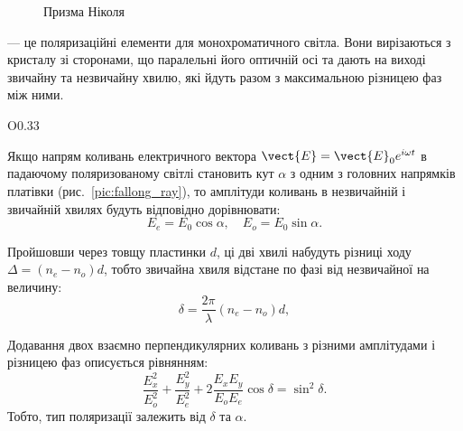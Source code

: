 \begin{figure}[h!]\centering

\caption{Призма Ніколя}
\label{pic:Nicol}
\end{figure}


 --- це поляризаційні елементи для
монохроматичного світла. Вони вирізаються з кристалу зі сторонами, що
паралельні його оптичній осі та дають на виході звичайну та незвичайну
хвилю, які йдуть разом з максимальною різницею фаз між ними.

\begin{wrapfigure}{O}{0.33\linewidth}\centering
\caption{Амплітуди коливань звичайного і незвичайного променів}
\label{pic:fallong_ray}
\end{wrapfigure}
Якщо напрям коливань електричного вектора $ \vect{E} = \vect{E}_0 e^{i\omega t}  $ в падаючому поляризованому світлі становить кут $\alpha$ з одним з головних напрямків платівки (рис.~\ref{pic:fallong_ray}), то амплітуди коливань в незвичайній і звичайній хвилях будуть відповідно дорівнювати:
\begin{equation*}
    E_e = E_0 \cos\alpha,\quad E_o = E_0\sin\alpha.
\end{equation*}


Пройшовши через товщу пластинки $ d $, ці дві хвилі набудуть різниці ходу  $ \Delta = (n_e - n_o) d$, тобто звичайна хвиля відстане по фазі від незвичайної на величину:
\begin{equation}\label{eq:phase_delta}
    \delta = \frac{2\pi}{\lambda} (n_e - n_o) d,
\end{equation}

Додавання двох взаємно перпендикулярних коливань з різними амплітудами і різницею фаз описується рівнянням:
\begin{equation}\label{eq:ellipse_eqn}
    \frac{E_x^2}{E_o^2} + \frac{E_y^2}{E_e^2} + 2\frac{E_xE_y}{E_oE_e}\cos\delta = \sin^2\delta.
\end{equation}
Тобто, тип поляризації залежить від $\delta$ та $ \alpha $.

